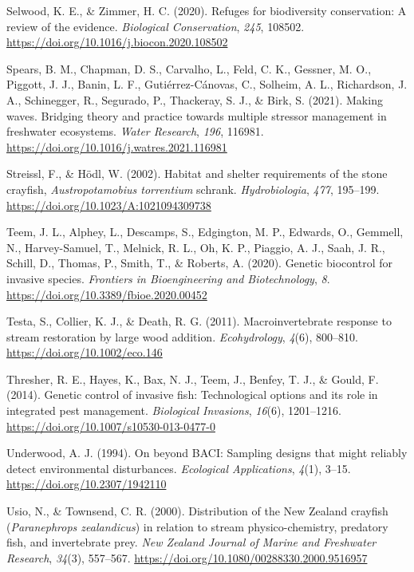 \documentclass[
  letterpaper,
  DIV=11,
  numbers=noendperiod]{scrartcl}
\newlength{\cslhangindent}
\newenvironment{CSLReferences}[2] %
 {\begin{list}{}{%
  \setlength{\itemindent}{0pt}
  \setlength{\leftmargin}{0pt}
  \setlength{\parsep}{0pt}
  \ifodd #1
   \setlength{\leftmargin}{\cslhangindent}
   \setlength{\itemindent}{-1\cslhangindent}
  \fi
  \setlength{\itemsep}{#2\baselineskip}}}
 {\end{list}}
\begin{document}
\begin{CSLReferences}{1}{0}
Selwood, K. E., \& Zimmer, H. C. (2020). Refuges for biodiversity
conservation: A review of the evidence. \emph{Biological Conservation},
\emph{245}, 108502. \url{https://doi.org/10.1016/j.biocon.2020.108502}

Spears, B. M., Chapman, D. S., Carvalho, L., Feld, C. K., Gessner, M.
O., Piggott, J. J., Banin, L. F., Gutiérrez-Cánovas, C., Solheim, A. L.,
Richardson, J. A., Schinegger, R., Segurado, P., Thackeray, S. J., \&
Birk, S. (2021). Making waves. Bridging theory and practice towards
multiple stressor management in freshwater ecosystems. \emph{Water
Research}, \emph{196}, 116981.
\url{https://doi.org/10.1016/j.watres.2021.116981}

Streissl, F., \& Hödl, W. (2002). Habitat and shelter requirements of
the stone crayfish, {\emph{Austropotamobius torrentium}} schrank.
\emph{Hydrobiologia}, \emph{477}, 195--199.
\url{https://doi.org/10.1023/A:1021094309738}

Teem, J. L., Alphey, L., Descamps, S., Edgington, M. P., Edwards, O.,
Gemmell, N., Harvey-Samuel, T., Melnick, R. L., Oh, K. P., Piaggio, A.
J., Saah, J. R., Schill, D., Thomas, P., Smith, T., \& Roberts, A.
(2020). Genetic biocontrol for invasive species. \emph{Frontiers in
Bioengineering and Biotechnology}, \emph{8}.
\url{https://doi.org/10.3389/fbioe.2020.00452}

Testa, S., Collier, K. J., \& Death, R. G. (2011). Macroinvertebrate
response to stream restoration by large wood addition.
\emph{Ecohydrology}, \emph{4}(6), 800--810.
\url{https://doi.org/10.1002/eco.146}

Thresher, R. E., Hayes, K., Bax, N. J., Teem, J., Benfey, T. J., \&
Gould, F. (2014). Genetic control of invasive fish: Technological
options and its role in integrated pest management. \emph{Biological
Invasions}, \emph{16}(6), 1201--1216.
\url{https://doi.org/10.1007/s10530-013-0477-0}

Underwood, A. J. (1994). On beyond {BACI}: Sampling designs that might
reliably detect environmental disturbances. \emph{Ecological
Applications}, \emph{4}(1), 3--15. \url{https://doi.org/10.2307/1942110}

Usio, N., \& Townsend, C. R. (2000). Distribution of the {New Zealand}
crayfish ({\emph{Paranephrops zealandicus}}) in relation to stream
physico-chemistry, predatory fish, and invertebrate prey. \emph{New
Zealand Journal of Marine and Freshwater Research}, \emph{34}(3),
557--567. \url{https://doi.org/10.1080/00288330.2000.9516957}


\end{CSLReferences}
\end{document}
